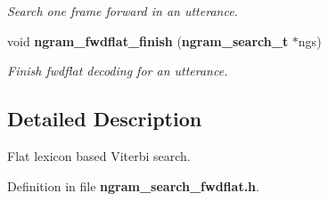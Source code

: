 \begin{DoxyCompactItemize}
\begin{DoxyCompactList}\small\item\em Search one frame forward in an utterance. \end{DoxyCompactList}\item 
void {\bf ngram\-\_\-fwdflat\-\_\-finish} ({\bf ngram\-\_\-search\-\_\-t} $\ast$ngs)\label{ngram__search__fwdflat_8h_ac855cf540ac4acdfa320629720ded6fe}

\begin{DoxyCompactList}\small\item\em Finish fwdflat decoding for an utterance. \end{DoxyCompactList}\end{DoxyCompactItemize}


\subsection{Detailed Description}
Flat lexicon based Viterbi search. 

Definition in file {\bf ngram\-\_\-search\-\_\-fwdflat.\-h}.

